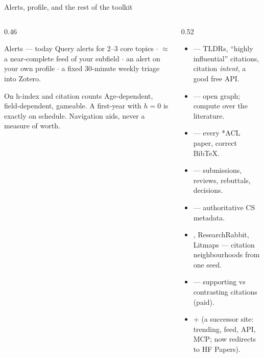 \documentclass[aspectratio=169,11pt]{beamer}
\begin{document}
\begin{frame}{Alerts, profile, and the rest of the toolkit}
\begin{columns}[T]
\begin{column}{0.46\textwidth}
\begin{block}{Alerts --- today}
\footnotesize
Query alerts for 2--3 core topics $\cdot$  $\approx$ a near-complete feed of your subfield $\cdot$ an alert on
your own profile $\cdot$ a fixed 30-minute weekly triage into Zotero.
\end{block}
\begin{alertblock}{On h-index and citation counts}
\footnotesize
Age-dependent, field-dependent, gameable. A first-year with $h=0$ is exactly on
schedule. Navigation aids, never a measure of worth.
\end{alertblock}
\end{column}
\begin{column}{0.52\textwidth}
\footnotesize
\begin{itemize}
  \item {} --- TLDRs, ``highly influential'' citations,
        citation \emph{intent}, a good free API.
  \item {} --- open graph; compute over the literature.
  \item {} --- every *ACL paper, correct BibTeX.
  \item {} --- submissions, reviews, rebuttals, decisions.
  \item {} --- authoritative CS metadata.
  \item {}, ResearchRabbit, Litmaps --- citation
        neighbourhoods from one seed.
  \item {} --- supporting vs contrasting citations (paid).
  \item {} +  (a successor
        site: trending, feed, API, MCP;  now redirects to HF Papers).
\end{itemize}
\end{column}
\end{columns}
\end{frame}
\end{document}
